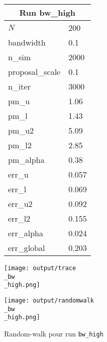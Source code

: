 
\begin{figure}[H]
  \centering
  \begin{minipage}[t]{0.45\textwidth}
    \vspace{0pt}
    \footnotesize
    \begin{tabular}{|l|l|}\hline
    \multicolumn{2}{|c|}{\textbf{Run bw\_high}} \\ \hline
    $N$ & 200 \\ \hline
    bandwidth & 0.1 \\ \hline
    n\_sim & 2000 \\ \hline
    proposal\_scale & 0.1 \\ \hline
    n\_iter & 3000 \\ \hline
    pm\_u & 1.06 \\ \hline
    pm\_l & 1.43 \\ \hline
    pm\_u2 & 5.09 \\ \hline
    pm\_l2 & 2.85 \\ \hline
    pm\_alpha & 0.38 \\ \hline
    err\_u & 0.057 \\ \hline
    err\_l & 0.069 \\ \hline
    err\_u2 & 0.092 \\ \hline
    err\_l2 & 0.155 \\ \hline
    err\_alpha & 0.024 \\ \hline
    err\_global & 0.203 \\ \hline
    \end{tabular}
  \end{minipage}
  \hfill
  \begin{minipage}[t]{0.45\textwidth}
    \vspace{0pt}
    \texttt{[image: output/trace\\\_bw\\\_high.png]}
  \end{minipage}
\end{figure}

\begin{figure}[H]
  \centering
  \texttt{[image: output/randomwalk\\\_bw\\\_high.png]}
  \caption{Random-walk pour run \texttt{bw\_high}}
\end{figure}

